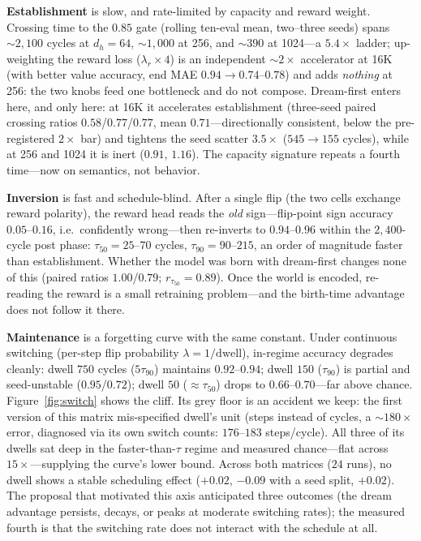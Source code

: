 \documentclass[11pt,a4paper]{article}
\begin{document}
\textbf{Establishment} is slow, and rate-limited by capacity and reward weight. Crossing time to the $0.85$ gate (rolling ten-eval mean, two--three seeds) spans ${\sim}2{,}100$ cycles at $d_h{=}64$, ${\sim}1{,}000$ at 256, and ${\sim}390$ at 1024---a $5.4\times$ ladder; up-weighting the reward loss ($\lambda_r \times 4$) is an independent ${\sim}2\times$ accelerator at 16K (with better value accuracy, end MAE $0.94 \rightarrow 0.74$--$0.78$) and adds \emph{nothing} at 256: the two knobs feed one bottleneck and do not compose. Dream-first enters here, and only here: at 16K it accelerates establishment (three-seed paired crossing ratios $0.58$/$0.77$/$0.77$, mean $0.71$---directionally consistent, below the pre-registered $2\times$ bar) and tightens the seed scatter $3.5\times$ ($545 \rightarrow 155$ cycles), while at 256 and 1024 it is inert ($0.91$, $1.16$). The capacity signature repeats a fourth time---now on semantics, not behavior.

\textbf{Inversion} is fast and schedule-blind. After a single flip (the two cells exchange reward polarity), the reward head reads the \emph{old} sign---flip-point sign accuracy $0.05$--$0.16$, i.e.\ confidently wrong---then re-inverts to $0.94$--$0.96$ within the $2{,}400$-cycle post phase: $\tau_{50} = 25$--$70$ cycles, $\tau_{90} = 90$--$215$, an order of magnitude faster than establishment. Whether the model was born with dream-first changes none of this (paired ratios $1.00$/$0.79$; $r_{\tau_{50}} = 0.89$). Once the world is encoded, re-reading the reward is a small retraining problem---and the birth-time advantage does not follow it there.

\textbf{Maintenance} is a forgetting curve with the same constant. Under continuous switching (per-step flip probability $\lambda = 1/\mathrm{dwell}$), in-regime accuracy degrades cleanly: dwell $750$ cycles ($5\tau_{90}$) maintains $0.92$--$0.94$; dwell $150$ ($\tau_{90}$) is partial and seed-unstable ($0.95$/$0.72$); dwell $50$ ($\approx\tau_{50}$) drops to $0.66$--$0.70$---far above chance. Figure~\ref{fig:switch} shows the cliff. Its grey floor is an accident we keep: the first version of this matrix mis-specified dwell's unit (steps instead of cycles, a ${\sim}180\times$ error, diagnosed via its own switch counts: $176$--$183$ steps/cycle). All three of its dwells sat deep in the faster-than-$\tau$ regime and measured chance---flat across $15\times$---supplying the curve's lower bound. Across both matrices ($24$ runs), no dwell shows a stable scheduling effect ($+0.02$, $-0.09$ with a seed split, $+0.02$). The proposal that motivated this axis anticipated three outcomes (the dream advantage persists, decays, or peaks at moderate switching rates); the measured fourth is that the switching rate does not interact with the schedule at all.
\end{document}
